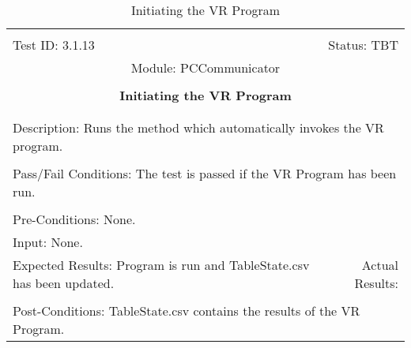 \documentclass[titlepage]{article}
\begin{document}
\begin{center}%
\begin{table}[h!]
\begin{tabular}{|l r|}\hline&\\[-2mm]
	Test ID: 3.1.13	&Status: TBT\\[-3mm]
	\multicolumn{2}{|c|}{Module: PCCommunicator}\\&\\
	\multicolumn{2}{|c|}{\textbf{\large{Initiating the VR Program}}}\\&\\\hline&\\[-3mm]
	\multicolumn{2}{|p{\textwidth}|}{Description: Runs the method which automatically invokes the VR program.}\\[1mm]\hline&\\[-3mm]
	\multicolumn{2}{|p{\textwidth}|}{Pass/Fail Conditions: The test is passed if the VR Program has been run.}\\[1mm]\hline&\\[-3mm]
	\multicolumn{2}{|p{\textwidth}|}{Pre-Conditions: None.}\\[4mm]
	\multicolumn{2}{|p{\textwidth}|}{Input: None.}\\[2mm]\hline
	\multicolumn{1}{|p{0.49\textwidth}}{Expected Results: Program is run and TableState.csv has been updated.}	&\multicolumn{1}{|p{0.45\textwidth}|}{Actual Results: }\\\hline&\\[-3mm]
	\multicolumn{2}{|p{\textwidth}|}{Post-Conditions: TableState.csv contains the results of the VR Program.}\\\hline
\end{tabular}
\caption{Initiating the VR Program}
\end{table}
\end{center}
\newpage
\end{document}
